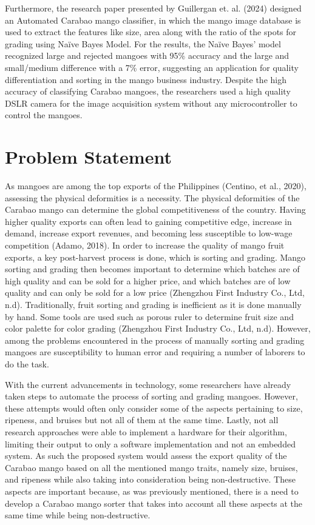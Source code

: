 Furthermore, the research paper presented by Guillergan et. al. (2024) designed an Automated Carabao mango classifier, 
in which the mango image database is used to extract the features like size, area along with the ratio of the spots for 
grading using Naïve Bayes Model. For the results, the Naïve Bayes’ model recognized large and rejected mangoes with 95\%
 accuracy and the large and small/medium difference with a 7\% error, suggesting an application for quality differentiation 
 and sorting in the mango business industry. Despite the high accuracy of classifying Carabao mangoes, the researchers used a 
 high quality DSLR camera for the image acquisition system without any microcontroller to control the mangoes. 


\section{Problem Statement}
As mangoes are among the top exports of the Philippines (Centino, et al., 2020), 
assessing the physical deformities is a necessity. The physical deformities of the 
Carabao mango can determine the global competitiveness of the country. Having higher quality
 exports can often lead to gaining competitive edge, increase in demand, increase export revenues,
  and becoming less susceptible to low-wage competition (Adamo, 2018). In order to increase the 
  quality of mango fruit exports, a key post-harvest process is done, which is sorting and grading.
   Mango sorting and grading then becomes important to determine which batches are of high quality and
    can be sold for a higher price, and which batches are of low quality and can only be sold for a low price
	 (Zhengzhou First Industry Co., Ltd, n.d). Traditionally, fruit sorting and grading is inefficient as it is
	  done manually by hand. Some tools are used such as porous ruler to determine fruit size and color palette 
	  for color grading (Zhengzhou First Industry Co., Ltd, n.d). However, among the problems encountered in the 
	  process of manually sorting and grading mangoes are susceptibility to human error and requiring a number of 
	  laborers to do the task. 

	  With the current advancements in technology, some researchers have already taken steps to automate the process
	   of sorting and grading mangoes. However, these attempts would often only consider some of the aspects 
	   pertaining to size, ripeness, and \gls{bruises} but not all of them at the same time. Lastly, not all research approaches
	    were able to implement a hardware for their algorithm, limiting their output to only a software implementation and not
		 an embedded system. As such the proposed system would assess the export quality of the Carabao mango based on all the
		  mentioned mango traits, namely size, \gls{bruises}, and ripeness while also taking into consideration being non-destructive.
		   These aspects are important because, as was previously mentioned, there is a need to develop a Carabao mango sorter 
		   that takes into account all these aspects at the same time while being non-destructive.



